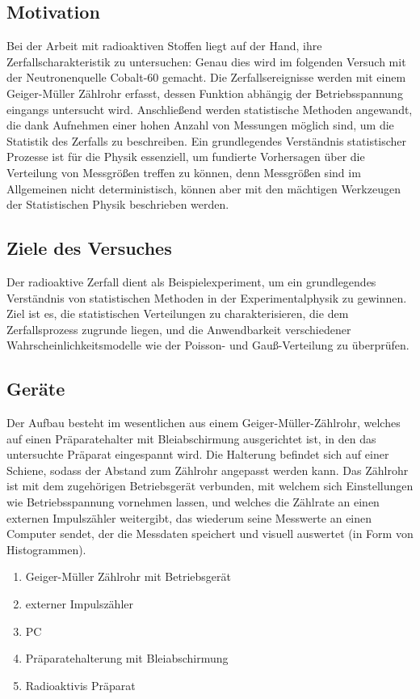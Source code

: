 \subsection{Motivation}
Bei der Arbeit mit radioaktiven Stoffen liegt auf der Hand, ihre Zerfallscharakteristik zu untersuchen: Genau dies wird im folgenden Versuch mit der Neutronenquelle Cobalt-60  gemacht. Die Zerfallsereignisse werden mit einem Geiger-Müller Zählrohr erfasst, dessen Funktion abhängig der Betriebsspannung eingangs untersucht wird. Anschließend werden statistische Methoden angewandt, die dank Aufnehmen einer hohen Anzahl von Messungen möglich sind, um die Statistik des Zerfalls zu beschreiben. Ein grundlegendes Verständnis statistischer Prozesse ist für die Physik essenziell, um fundierte Vorhersagen über die Verteilung von Messgrößen treffen zu können, denn Messgrößen sind im Allgemeinen nicht deterministisch, können aber mit den mächtigen Werkzeugen der Statistischen Physik beschrieben werden.

\subsection{Ziele des Versuches}
Der radioaktive Zerfall dient als Beispielexperiment, um ein grundlegendes Verständnis von statistischen Methoden in der Experimentalphysik zu gewinnen. Ziel ist es, die statistischen Verteilungen zu charakterisieren, die dem Zerfallsprozess zugrunde liegen, und die Anwendbarkeit verschiedener Wahrscheinlichkeitsmodelle wie der Poisson- und Gauß-Verteilung zu überprüfen.

\subsection{Geräte}
Der Aufbau besteht im wesentlichen aus einem Geiger-Müller-Zählrohr, welches auf einen Präparatehalter mit Bleiabschirmung ausgerichtet ist, in den das untersuchte Präparat eingespannt wird. Die Halterung befindet sich auf einer Schiene, sodass der Abstand zum Zählrohr angepasst werden kann. Das Zählrohr ist mit dem zugehörigen Betriebsgerät verbunden, mit welchem sich Einstellungen wie Betriebsspannung vornehmen lassen, und welches die Zählrate an einen externen Impulszähler weitergibt, das wiederum seine Messwerte an einen Computer sendet, der die Messdaten speichert und visuell auswertet (in Form von Histogrammen). 

\begin{enumerate}
    \item Geiger-Müller Zählrohr mit Betriebsgerät  
    \item externer Impulszähler
    \item PC
    \item Präparatehalterung mit Bleiabschirmung
    \item Radioaktivis Präparat 
\end{enumerate}
\newpage
\newpage


